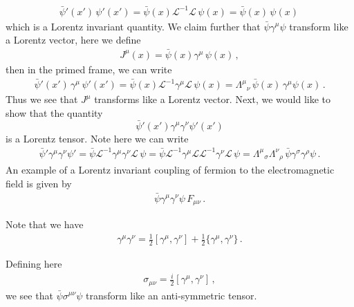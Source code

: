 \documentclass[11pt, onesided]{book}
\theoremstyle{break}
\theoremstyle{break}
\begin{document}
\begin{align*}
\bar{\psi}'(x') \, \psi'(x') = \bar{\psi}(x) \mathcal{L}^{-1}\mathcal{L}\, \psi(x) = \bar{\psi}(x) \, \psi(x)\,
\end{align*}
which is a Lorentz invariant quantity. We claim further that $\bar{\psi}\gamma^\mu \psi$ transform like a Lorentz vector, here we define
\begin{align*}
J^\mu(x) = \bar{\psi}(x) \gamma^\mu \, \psi(x) \,,
\end{align*}
then in the primed frame, we can write
\begin{align*}
\bar{\psi}'(x') \, \gamma^\mu \,\psi'(x') =\bar{\psi}(x) \mathcal{L}^{-1} \gamma^\mu \mathcal{L}\, \psi(x) =\Lambda^\mu{}_\nu \,\bar{\psi}(x) \, \gamma^\mu \psi(x)\,.
\end{align*}
Thus we see that $J^\mu$ transforms like a Lorentz vector. Next, we would like to show that the quantity 
$$\bar{\psi}'(x') \gamma^\mu \gamma^\nu \psi'(x')$$
is a Lorentz tensor. Note here we can write
\begin{align*}
\bar{\psi}' \gamma^\mu \gamma^\nu \psi' = \bar{\psi} \mathcal{L}^{-1} \gamma^\mu \gamma^\nu \mathcal{L}\, \psi=  \bar{\psi} \mathcal{L}^{-1} \gamma^\mu \mathcal{L}\mathcal{L}^{-1 }\gamma^\nu \mathcal{L}\, \psi = \Lambda^{\mu}{}_\sigma\Lambda^\nu{}_{\rho}\,\bar{\psi} \gamma^\sigma\gamma^\rho \psi\,.
\end{align*}
An example of a Lorentz invariant coupling of fermion to the electromagnetic field is given by 
\begin{align*}
\bar{\psi} \gamma^{\mu}\gamma^{\nu}\psi\, F_{\mu\nu}\,.
\end{align*}

Note that we have
\begin{align*}
\gamma^\mu \gamma^\nu = \frac{1}{2}[\gamma^\mu, \gamma^\nu] + \frac{1}{2}\{\gamma^\mu , \gamma^\nu\}\,.
\end{align*}

Defining here
\begin{align*}
\sigma_{\mu\nu} = \frac{i}{2}[\gamma^\mu , \gamma^\nu]\,,
\end{align*}
we see that $\bar{\psi} \sigma^{\mu\nu}\psi$ transform like an anti-symmetric tensor. \\
\end{document}
